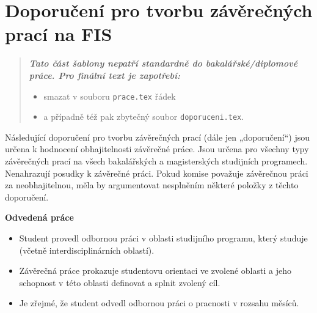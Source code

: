\chapter*{Doporučení pro tvorbu závěrečných prací na FIS}

\begin{quote}
\bfseries\itshape
Tato část šablony nepatří standardně do bakalářské/diplomové práce. Pro finální 
text je zapotřebí:
\begin{itemize}
\item smazat v souboru \verb|prace.tex| řádek \verb||
\item  a případně též pak zbytečný soubor \verb|doporuceni.tex|.
\end{itemize}
\end{quote}

Následující doporučení pro tvorbu závěrečných prací (dále jen „doporučení“) jsou 
určena k hodnocení obhajitelnosti závěrečné práce. Jsou určena pro všechny typy 
závěrečných prací na všech bakalářských a magisterských studijních programech. 
Nenahrazují posudky k závěrečné práci. Pokud komise považuje závěrečnou práci za 
neobhajitelnou, měla by argumentovat nesplněním některé položky z těchto 
doporučení.

{\bfseries\sffamily\Large Odvedená práce}
\begin{itemize}
\item \vspace*{-2ex}Student provedl odbornou práci v oblasti studijního programu, který studuje (včetně interdisciplinárních oblastí).
\item Závěrečná práce prokazuje studentovu orientaci ve zvolené oblasti a jeho schopnost v této oblasti definovat a splnit zvolený cíl. 
\item Je zřejmé, že student odvedl odbornou práci o pracnosti v rozsahu měsíců.
\end{itemize}

